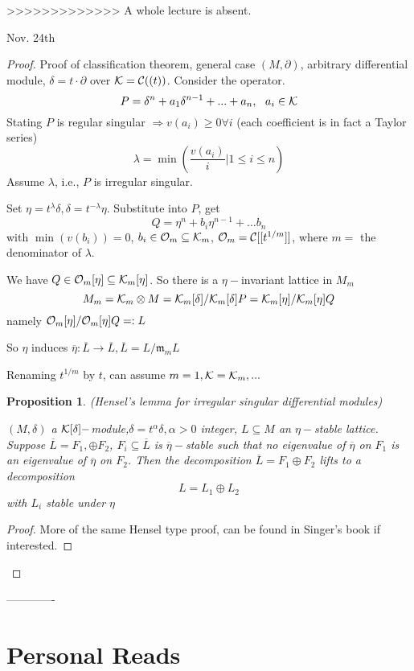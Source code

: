\documentclass[11pt]{article}
\newtheorem{prop}[thm]{Proposition}
\newcommand{\pd}{\partial}
\newcommand{\scm}{{\mathfrak m}}
\newcommand{\calc}{{\cal C}}
\newcommand{\calk}{{\cal K}}
\newcommand{\calo}{{\cal O}}
\newcommand{\Lrta}{\Longrightarrow}
\newcommand{\lrta}{\longrightarrow}
\begin{document}
>>>>>>>>>>>>> A whole lecture is absent.






Nov. 24th
\begin{proof}
Proof of classification theorem, general case $(M,\pd)$, arbitrary differential module, $\delta=t\cdot\pd$ over $\calk=\calc((t))$. Consider the operator.
$$
P=\delta^n+a_1\delta^{n-1}+...+a_n,\ \ a_i\in\calk
$$
Stating $P$ is regular singular $\Lrta v(a_i)\geq 0\forall i$ (each coefficient is in fact a Taylor series)
$$
\lambda=\min\left(\frac{v(a_i)}{i}|1\leq i\leq n\right)
$$
Assume $\lambda$, i.e., $P$ is irregular singular.

Set $\eta=t^\lambda \delta,\delta=t^{-\lambda}\eta$. Substitute into $P$, get 
$$
Q=\eta^n+b_i\eta^{n-1}+...b_n
$$
with $\min (v(b_i))=0$, $b_i\in\calo_m\subseteq \calk_m$, $\calo_m=\calc[[t^{1/m}]]$, where $m=$ the denominator of $\lambda$.

We have $Q\in\calo_m[\eta]\subseteq\calk_m[\eta]$. So there is a $\eta-$invariant lattice in $M_m$
$$
M_m=\calk_m\otimes M=\calk_m[\delta]/\calk_m[\delta]P=\calk_m[\eta]/\calk_m[\eta]Q
$$
namely $\calo_m[\eta]/\calo_m[\eta]Q=:L$

So $\eta$ induces $\overline{\eta}:\overline{L}\lrta\overline{L}, \overline{L}=L/\scm_m L$

Renaming $t^{1/m}$ by $t$, can assume $m=1,\calk=\calk_m,...$
\begin{prop}
(Hensel's lemma for irregular singular differential modules)

$(M,\delta)$ a $\calk[\delta]-$module,$\delta=t^\alpha\delta,\alpha >0$ integer, $L\subseteq M$ an $\eta-$stable lattice. Suppose $\overline{L}=F_1,\oplus F_2$, $F_i\subseteq \overline{L}$ is $\overline{\eta}-$stable such that no eigenvalue of $\overline{\eta}$ on $F_1$ is an eigenvalue of $\overline{\eta}$ on $F_2$. Then the decomposition $\overline{L}=F_1\oplus F_2$ lifts to a decomposition 
$$
L=L_1\oplus L_2
$$
with $L_i$ stable under $\eta$
\end{prop}
\begin{proof}
More of the same Hensel type proof, can be found in Singer's book if interested.
\end{proof}




\end{proof}






-------------
\section{Personal Reads}
\end{document}
